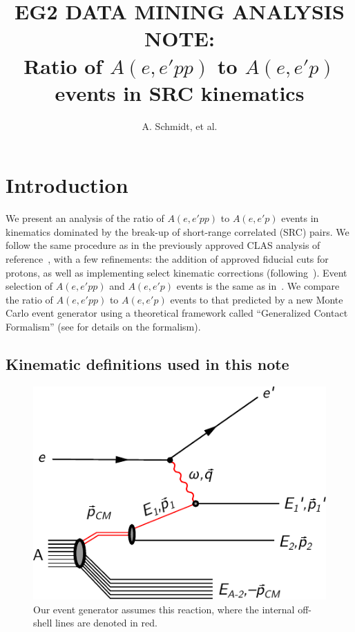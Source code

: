 \documentclass{article}
\title{EG2 DATA MINING ANALYSIS NOTE: \\
Ratio of $A(e,e'pp)$ to $A(e,e'p)$ events in SRC kinematics}
\author{A. Schmidt, et al.}
\begin{document}
\maketitle

\section{Introduction}

We present an analysis of the ratio of $A(e,e'pp)$ to $A(e,e'p)$ events in kinematics
dominated by the break-up of short-range correlated (SRC) pairs. We follow the same
procedure as in the previously approved CLAS analysis of reference~\cite{Or:note},
with a few refinements: the addition of approved fiducial cuts \cite{Lamiah:note} 
for protons, as well as implementing select kinematic corrections (following~\cite{Barak:note}).
Event selection of $A(e,e'pp)$ and $A(e,e'p)$ events is the same as in~\cite{Or:note}.
We compare the ratio of $A(e,e'pp)$ to $A(e,e'p)$ events to that predicted by a new 
Monte Carlo event generator using a theoretical framework 
called ``Generalized Contact Formalism'' (see \cite{weiss:2016obx,Weiss:2018tbu} for
details on the formalism). 

\subsection{Kinematic definitions used in this note}

\begin{figure}[htpb]
\centering
\includegraphics{reaction.pdf}
\caption{
Our event generator assumes this reaction, where the internal off-shell lines are
denoted in red.
\label{fig:reaction}}
\end{figure}
\end{document}
